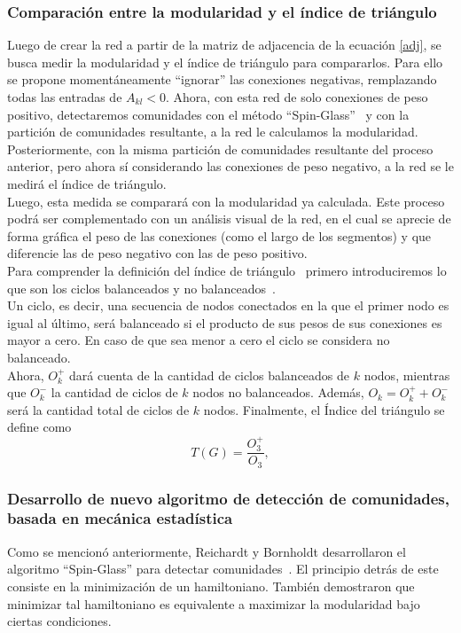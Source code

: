 \documentclass{proyectotesis}
\begin{document}
\subsubsection{Comparación entre la modularidad y el índice de triángulo} 
Luego de crear la red a partir de la matriz de adjacencia de la ecuación \eqref{adj}, se busca medir la modularidad y el índice de triángulo para compararlos. Para ello se propone momentáneamente ``ignorar'' las conexiones negativas, remplazando todas las entradas de $A_{kl} < 0$. Ahora, con esta red de solo conexiones de peso positivo, detectaremos comunidades con el método ``Spin-Glass''~\cite{reichardt_statistical_2006} y con la partición de comunidades resultante, a la red le calculamos la modularidad. \\

Posteriormente, con la misma partición de comunidades resultante del proceso anterior, pero ahora sí considerando las conexiones de peso negativo, a la red se le medirá el índice de triángulo. \\

Luego, esta medida se comparará con la modularidad ya calculada. Este proceso podrá ser complementado con un análisis visual de la red, en el cual se aprecie de forma gráfica el peso de las conexiones (como el largo de los segmentos) y que diferencie las de peso negativo con las de peso positivo.\\

Para comprender la definición del índice de triángulo~\cite{aref_measuring_2018} primero introduciremos lo que son los ciclos balanceados y no balanceados~\cite{aref_measuring_2018}.\\

Un ciclo, es decir, una secuencia de nodos conectados en la que el primer nodo es igual al último, será balanceado si el producto de sus pesos de sus conexiones es mayor a cero. En caso de que sea menor a cero el ciclo se considera no balanceado.\\

Ahora, $O_k^+$ dará cuenta de la cantidad de ciclos balanceados de $k$ nodos, mientras que $O_k^-$ la cantidad de ciclos de $k$ nodos no balanceados. Además, $O_k = O_k^+ + O_k^-$ será la cantidad total de ciclos de $k$ nodos. Finalmente, el Índice del triángulo se define como
\begin{equation}
    T(G) = \frac{O_3^+}{O_3},
\end{equation}

\subsubsection{Desarrollo de nuevo algoritmo de detección de comunidades, basada en mecánica estadística} 
Como se mencionó anteriormente, Reichardt y Bornholdt desarrollaron el algoritmo ``Spin-Glass'' para detectar comunidades~\cite{reichardt_statistical_2006}. El principio detrás de este consiste en la minimización de un hamiltoniano. También demostraron que minimizar tal hamiltoniano es equivalente a maximizar la modularidad bajo ciertas condiciones.
\end{document}

